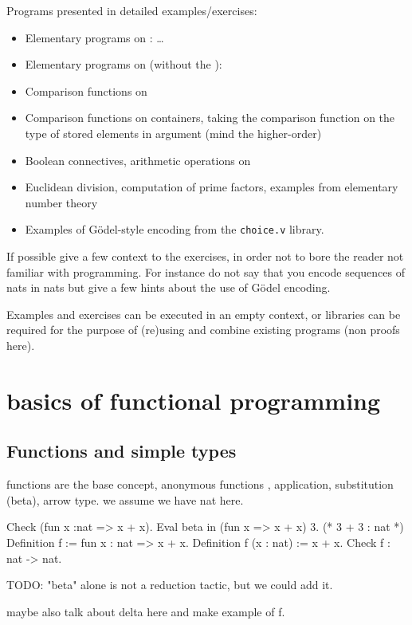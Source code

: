 Programs presented in detailed examples/exercises:
\begin{itemize}
\item Elementary programs on : \dots
\item Elementary programs on  (without the ):
\item Comparison functions on 
\item Comparison functions on containers, taking the comparison
  function on the type of stored elements in argument (mind the
  higher-order)
\item Boolean connectives, arithmetic operations on 
\item Euclidean division, computation of prime factors, examples from
  elementary number theory
\item Examples of G{\"o}del-style encoding from the {\tt choice.v} library.
\end{itemize}
If possible give a few context to the exercises, in order not to bore
the reader not familiar with programming. For instance do not say that
you encode sequences of nats in nats but give a few hints about the
use of G{\"o}del encoding.

Examples and exercises can be executed in an empty context, or
libraries can be required for the purpose of (re)using and combine existing
programs (non proofs here).
\section{basics of functional programming}

\subsection{Functions and simple types}
functions are the base concept,
anonymous functions ,
application,
substitution (beta), arrow type.
we assume we have nat here.

\begin{coq}{}
Check (fun x :nat => x + x).
Eval beta in (fun x => x + x) 3. (* 3 + 3 : nat *)
Definition f := fun x : nat => x + x.
Definition f (x : nat) := x + x.
Check f : nat -> nat.
\end{coq}

TODO: "beta" alone is not a reduction tactic, but we could add it.

maybe also talk about delta here and make example of f.

